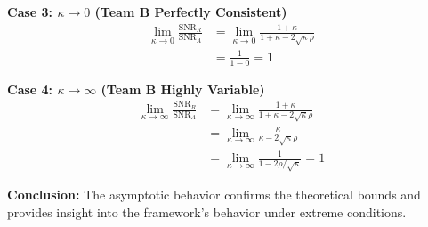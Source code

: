 \textbf{Case 3: $\kappa \to 0$ (Team B Perfectly Consistent)}
\begin{align}
\lim_{\kappa \to 0} \frac{\text{SNR}_R}{\text{SNR}_A} &= \lim_{\kappa \to 0} \frac{1 + \kappa}{1 + \kappa - 2\sqrt{\kappa}\rho} \\
&= \frac{1}{1 - 0} = 1
\end{align}

\textbf{Case 4: $\kappa \to \infty$ (Team B Highly Variable)}
\begin{align}
\lim_{\kappa \to \infty} \frac{\text{SNR}_R}{\text{SNR}_A} &= \lim_{\kappa \to \infty} \frac{1 + \kappa}{1 + \kappa - 2\sqrt{\kappa}\rho} \\
&= \lim_{\kappa \to \infty} \frac{\kappa}{\kappa - 2\sqrt{\kappa}\rho} \\
&= \lim_{\kappa \to \infty} \frac{1}{1 - 2\rho/\sqrt{\kappa}} = 1
\end{align}

\textbf{Conclusion:} The asymptotic behavior confirms the theoretical bounds and provides insight into the framework's behavior under extreme conditions.
